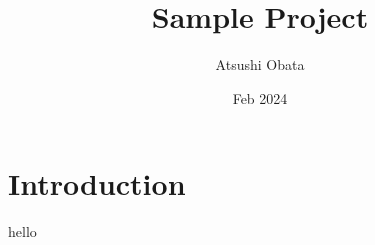 \documentclass{article}
\title{Sample Project}
\author{Atsushi Obata}
\date{Feb 2024}
\begin{document}
\maketitle
\section*{Introduction}
hello
\end{document}
